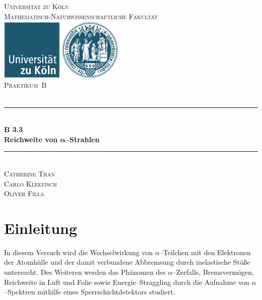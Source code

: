 \documentclass[12pt,a4paper]{scrartcl}
\numberwithin{equation}{section} %
\newcommand{\HRule}{\rule{\linewidth}{0.7mm}}
\begin{document}
\begin{titlepage}
	\pagestyle{empty}

	\begin{center}

	\textsc{\LARGE Universität zu Köln }\\ [0.4cm]
	\textsc{Mathematisch-Naturwissenschaftliche Fakultät} \\[1.5cm]

	\includegraphics[width=0.45\textwidth]{../media/uni.jpg}\\[1.5cm]  %

	\textsc{\Large Praktikum~B}\\[2mm]
	\textsc{}\\[10mm]
	\HRule \\[0.4cm]

		{	\Huge \bfseries B 3.3}\\[0.4cm]
			{	\huge \bfseries Reichweite von $\pmb{\alpha}$--Strahlen}\\[0.3cm]
	
	\HRule \\[3cm]

		\textsc{\Large Catherine Tran } \\[3pt]
		\textsc{\Large Carlo Kleefisch } \\[3pt]
		\textsc{\Large Oliver Filla } \\[3pt]
		

	\end{center}
\end{titlepage}

\newpage
\tableofcontents
\newpage

\hypertarget{einleitung}{%
\section{Einleitung}\label{einleitung}}

In diesem Versuch wird die Wechselwirkung von $\alpha$--Teilchen mit den Elektronen der Atomhülle und der damit verbundene Abbremsung durch inelastische Stöße untersucht. Des Weiteren werden das Phänomen des $\alpha$--Zerfalls, Bremsvermögen, Reichweite in Luft und Folie sowie Energie--Straggling durch die Aufnahme von $\alpha$--Spektren mithilfe eines Sperrschichtdetektors studiert.
\end{document}

